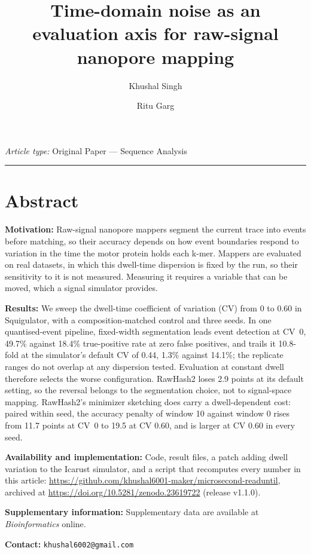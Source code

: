 \documentclass[11pt,a4paper]{article}
\title{\textbf{Time-domain noise as an evaluation axis for raw-signal nanopore mapping}}
\author[1,*]{Khushal Singh}
\author[1]{Ritu Garg}
\affil[1]{Department of Computer Engineering, National Institute of Technology Kurukshetra,
  Kurukshetra, Haryana 136119, India}
\affil[*]{To whom correspondence should be addressed: \texttt{khushal6002@gmail.com}}
\date{}
\newcommand{\zenodoslot}{\url{https://doi.org/10.5281/zenodo.23619722} (release v1.1.0)}
\begin{document}
\maketitle
\linenumbers

\noindent\textit{Article type:} Original Paper --- Sequence Analysis

\medskip
\noindent\rule{\linewidth}{0.4pt}
\section*{Abstract}

\noindent\textbf{Motivation:} Raw-signal nanopore mappers segment the current trace into events
before matching, so their accuracy depends on how event boundaries respond to variation in the time
the motor protein holds each k-mer. Mappers are evaluated on real datasets, in which this
dwell-time dispersion is fixed by the run, so their sensitivity to it is not measured. Measuring it
requires a variable that can be moved, which a signal simulator provides.

\smallskip
\noindent\textbf{Results:} We sweep the dwell-time coefficient of variation (CV) from 0 to 0.60
in Squigulator, with a composition-matched control and three seeds. In one quantised-event
pipeline, fixed-width segmentation leads event detection at CV~0, 49.7\% against 18.4\%
true-positive rate at zero false positives, and trails it 10.8-fold at the simulator's default CV
of 0.44, 1.3\% against 14.1\%; the replicate ranges do not overlap at any dispersion tested.
Evaluation at constant dwell therefore selects the worse configuration. RawHash2 loses 2.9 points
at its default setting, so the reversal belongs to the segmentation choice, not to signal-space
mapping. RawHash2's minimizer sketching does carry a dwell-dependent cost: paired within seed, the
accuracy penalty of window 10 against window 0 rises from 11.7 points at CV~0 to 19.5 at CV 0.60,
and is larger at CV 0.60 in every seed.

\smallskip
\noindent\textbf{Availability and implementation:} Code, result files, a patch adding dwell
variation to the Icarust simulator, and a script that recomputes every number in this article:
\url{https://github.com/khushal6001-maker/microsecond-readuntil}, archived at \zenodoslot.

\smallskip
\noindent\textbf{Supplementary information:} Supplementary data are available at
\textit{Bioinformatics} online.

\smallskip
\noindent\textbf{Contact:} \texttt{khushal6002@gmail.com}
\end{document}

